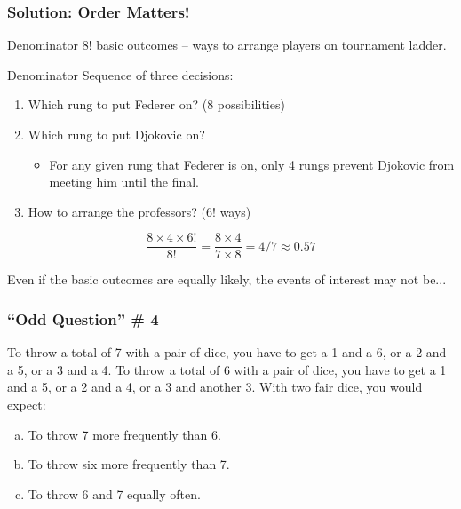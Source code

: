 \documentclass[handout]{beamer}
\begin{document}
\begin{frame}
  \frametitle{Solution: Order Matters!}
  \begin{block}{Denominator}
	$8!$ basic outcomes -- ways to arrange players on tournament ladder.
  \end{block}
  \begin{block}{Denominator}
   Sequence of three decisions:
   \begin{enumerate}
    \item Which rung to put Federer on? (8 possibilities)
    \item Which rung to put Djokovic on? 
      \begin{itemize}
        \item For any given rung that Federer is on, only 4 rungs prevent Djokovic from meeting him until the final.
      \end{itemize}
    \item How to arrange the professors? ($6!$ ways)
   \end{enumerate}
  \end{block}
\alert{$$\frac{8 \times 4 \times 6!}{8!} = \frac{8\times 4}{7\times 8} = 4/7 \approx 0.57$$}

\end{frame}
\begin{frame}

\centering \Huge Even if the basic outcomes are equally likely, the events of interest may not be...


\end{frame}
\begin{frame}
\frametitle{``Odd Question'' \# 4}
To throw a total of 7 with a pair of dice, you have to get a 1 and a 6, or a 2 and a 5, or a 3 and a 4.
To throw a total of 6 with a pair of dice, you have to get a 1 and a 5, or a 2 and a 4, or a 3 and another 3.
	\vspace{1em}
	With two fair dice, you would expect:
		\begin{enumerate}[(a)]
			\item To throw 7 more frequently than 6.
			\item To throw six more frequently than 7.
			\item To throw 6 and 7 equally often.
		\end{enumerate}
\end{frame}
\end{document}
